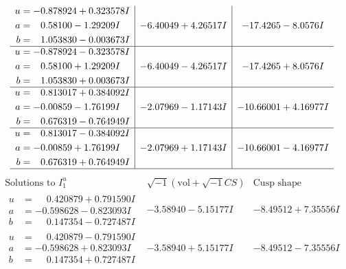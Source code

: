\documentclass[1p]{elsarticle_modified}
\theoremstyle{definition}
\newcommand{\I}{\sqrt{-1}}
\begin{document}
$$\begin{array}{c|c|c}
\begin{aligned}
u &= -0.878924 + 0.323578 I \\
a &= \phantom{-}0.58100 - 1.29209 I \\
b &= \phantom{-}1.053830 - 0.003673 I\end{aligned}
 & -6.40049 + 4.26517 I & -17.4265 - 8.0576 I \\ \hline\begin{aligned}
u &= -0.878924 - 0.323578 I \\
a &= \phantom{-}0.58100 + 1.29209 I \\
b &= \phantom{-}1.053830 + 0.003673 I\end{aligned}
 & -6.40049 - 4.26517 I & -17.4265 + 8.0576 I \\ \hline\begin{aligned}
u &= \phantom{-}0.813017 + 0.384092 I \\
a &= -0.00859 - 1.76199 I \\
b &= \phantom{-}0.676319 - 0.764949 I\end{aligned}
 & -2.07969 - 1.17143 I & -10.66001 + 4.16977 I \\ \hline\begin{aligned}
u &= \phantom{-}0.813017 - 0.384092 I \\
a &= -0.00859 + 1.76199 I \\
b &= \phantom{-}0.676319 + 0.764949 I\end{aligned}
 & -2.07969 + 1.17143 I & -10.66001 - 4.16977 I\\
 \hline 
 \end{array}$$\newpage$$\begin{array}{c|c|c}  
\text{Solutions to }I^u_{1}& \I (\text{vol} + \sqrt{-1}CS) & \text{Cusp shape}\\
 \hline 
\begin{aligned}
u &= \phantom{-}0.420879 + 0.791590 I \\
a &= -0.598628 - 0.823093 I \\
b &= \phantom{-}0.147354 - 0.727487 I\end{aligned}
 & -3.58940 - 5.15177 I & -8.49512 + 7.35556 I \\ \hline\begin{aligned}
u &= \phantom{-}0.420879 - 0.791590 I \\
a &= -0.598628 + 0.823093 I \\
b &= \phantom{-}0.147354 + 0.727487 I\end{aligned}
 & -3.58940 + 5.15177 I & -8.49512 - 7.35556 I \\ \hline\begin{aligned}

\end{aligned}
\end{array}$$
\end{document}
